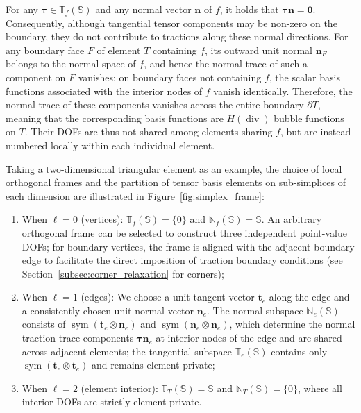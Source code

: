 For any $\boldsymbol{\tau} \in \mathbb{T}_f(\mathbb{S})$ and any normal vector $\boldsymbol{n}$ of $f$, it holds that $\boldsymbol{\tau}\boldsymbol{n} = \boldsymbol{0}$. Consequently, although tangential tensor components may be non-zero on the boundary, they do not contribute to tractions along these normal directions. For any boundary face $F$ of element $T$ containing $f$, its outward unit normal $\boldsymbol{n}_F$ belongs to the normal space of $f$, and hence the normal trace of such a component on $F$ vanishes; on boundary faces not containing $f$, the scalar basis functions associated with the interior nodes of $f$ vanish identically. Therefore, the normal trace of these components vanishes across the entire boundary $\partial T$, meaning that the corresponding basis functions are $H(\operatorname{div})$ bubble functions on $T$. Their DOFs are thus not shared among elements sharing $f$, but are instead numbered locally within each individual element.

Taking a two-dimensional triangular element as an example, the choice of local orthogonal frames and the partition of tensor basis elements on sub-simplices of each dimension are illustrated in Figure~\ref{fig:simplex_frame}:
\begin{enumerate}
\item When $\ell = 0$ (vertices): $\mathbb{T}_f(\mathbb{S}) = \{0\}$ and $\mathbb{N}_f(\mathbb{S}) = \mathbb{S}$. An arbitrary orthogonal frame can be selected to construct three independent point-value DOFs; for boundary vertices, the frame is aligned with the adjacent boundary edge to facilitate the direct imposition of traction boundary conditions (see Section~\ref{subsec:corner_relaxation} for corners);
\item When $\ell = 1$ (edges): We choose a unit tangent vector $\boldsymbol{t}_e$ along the edge and a consistently chosen unit normal vector $\boldsymbol{n}_e$. The normal subspace $\mathbb{N}_e(\mathbb{S})$ consists of $\operatorname{sym}(\boldsymbol{t}_e \otimes \boldsymbol{n}_e)$ and $\operatorname{sym}(\boldsymbol{n}_e \otimes \boldsymbol{n}_e)$, which determine the normal traction trace components $\boldsymbol{\tau}\boldsymbol{n}_e$ at interior nodes of the edge and are shared across adjacent elements; the tangential subspace $\mathbb{T}_e(\mathbb{S})$ contains only $\operatorname{sym}(\boldsymbol{t}_e \otimes \boldsymbol{t}_e)$ and remains element-private;
\item When $\ell = 2$ (element interior): $\mathbb{T}_T(\mathbb{S}) = \mathbb{S}$ and $\mathbb{N}_T(\mathbb{S}) = \{0\}$, where all interior DOFs are strictly element-private.
\end{enumerate}

